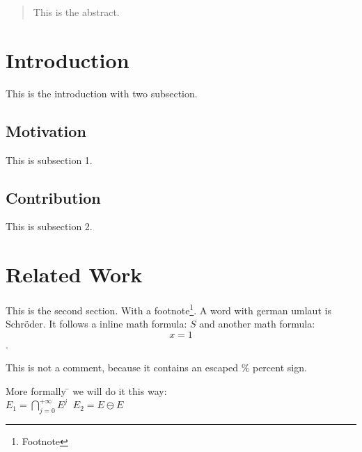 


\begin{abstract}
This is the abstract.
\end{abstract}

\section{Introduction}
This is the introduction with two subsection.

\subsection{Motivation}
This is subsection 1.

\subsection{Contribution}
This is subsection 2.

\section{Related Work}\label{xxx}
This is the second section. With a footnote\footnote{Footnote}.
A word with german umlaut is Schr\"oder. It follows a inline math formula: $S$
and another math formula: $$x=1$$.

This is not a comment, because it contains an escaped \% percent sign.

\begin{tabbing}
More formally \=\+ we will do it this way:\\
$E_1=\bigcap_{j=0}^{+\infty}E^j\;\;E_2=E\ominus E$\\
\end{tabbing}


